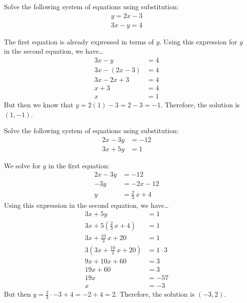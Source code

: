 \documentclass[11pt,letterpaper]{article}
\begin{document}

 Solve the following system of equations using substitution:
	\[
	\begin{aligned}
	y= 2x - 3 \\
	3x - y= 4
	\end{aligned}
	\] \pspace

\sol The first equation is already expressed in terms of $y$. Using this expression for $y$ in the second equation, we have\dots
	\[
	\begin{aligned}
	3x - y&= 4 \\[0.3cm]
	3x - (2x - 3)&= 4 \\[0.3cm]
	3x - 2x + 3&= 4 \\[0.3cm]
	x + 3&= 4 \\[0.3cm]
	x&= 1
	\end{aligned}
	\] 
But then we know that $y= 2(1) - 3= 2 - 3= -1$. Therefore, the solution is $(1, -1)$. 





\newpage





 Solve the following system of equations using substitution: 
	\[
	\begin{aligned}
	2x - 3y&= -12 \\
	3x + 5y&= 1
	\end{aligned}
	\] \pspace

\sol We solve for $y$ in the first equation:
	\[
	\begin{aligned}
	2x - 3y&= -12 \\[0.3cm]
	-3y&= -2x - 12 \\[0.3cm]
	y&= \frac{2}{3}\,x + 4
	\end{aligned}
	\]
Using this expression in the second equation, we have\dots
	\[
	\begin{aligned}
	3x + 5y&= 1 \\[0.3cm]
	3x + 5\left(\frac{2}{3}\,x + 4 \right)&= 1 \\[0.3cm]
	3x + \frac{10}{3}\, x + 20&= 1 \\[0.3cm]
	3 \left( 3x + \frac{10}{3}\, x + 20 \right)&= 1 \cdot 3 \\[0.3cm]
	9x + 10x + 60&= 3 \\[0.3cm]
	19x + 60&= 3 \\[0.3cm]
	19x&= -57 \\[0.3cm]
	x&= -3
	\end{aligned}
	\]
But then $y= \frac{2}{3} \cdot -3 + 4= -2 + 4= 2$. Therefore, the solution is $(-3, 2)$. 
\end{document}
